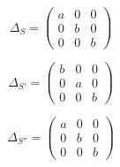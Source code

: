 \begin{equation}
	\Delta_{S} =
	\left(
	\begin{array}{ccc}
		a & 0 & 0 \\
		0 & b & 0 \\
		0 & 0 & b
	\end{array}
	\right)
\label{formaS}
\end{equation}

\begin{equation}
	\Delta_{S'} =
	\left(
	\begin{array}{ccc}
		b & 0 & 0 \\
		0 & a & 0 \\
		0 & 0 & b
	\end{array}
	\right)
\label{formaSl}
\end{equation}

\begin{equation}
	\Delta_{S''} =
	\left(
	\begin{array}{ccc}
		a & 0 & 0 \\
		0 & b & 0 \\
		0 & 0 & b
	\end{array}
	\right)
\label{formaSll}
\end{equation}